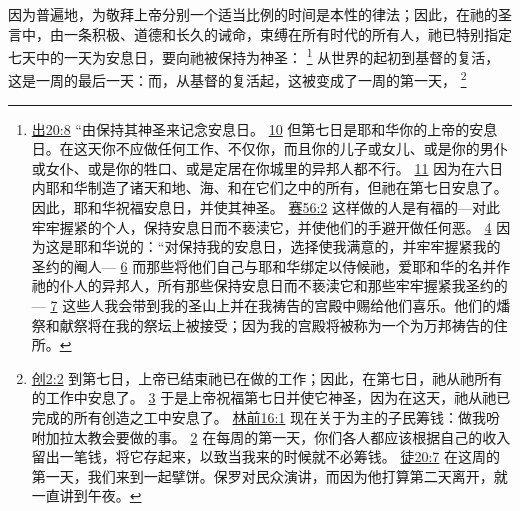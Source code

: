 \documentclass[12pt, a4paper, oneside]{ctexart}
\newcounter{parnum}[section]
\newcommand{\N}{%
   \noindent\refstepcounter{parnum}%
    \makebox[\parindent][l]{\textbf{\arabic{parnum}.}}}
\begin{document}
\N 因为普遍地，为敬拜上帝分别一个适当比例的时间是本性的律法；因此，在祂的圣言中，由一条积极、道德和长久的诫命，束缚在所有时代的所有人，祂已特别指定七天中的一天为安息日，要向祂被保持为神圣：
	\footnote {
		\href{https://biblehub.com/exodus/20-8.htm}{出20:8} “由保持其神圣来记念安息日。
		\href{https://biblehub.com/exodus/20-10.htm}{10} 但第七日是耶和华你的上帝的安息日。在这天你不应做任何工作、不仅你，而且你的儿子或女儿、或是你的男仆或女仆、或是你的牲口、或是定居在你城里的异邦人都不行。
		\href{https://biblehub.com/exodus/20-11.htm}{11} 因为在六日内耶和华制造了诸天和地、海、和在它们之中的所有，但祂在第七日安息了。因此，耶和华祝福安息日，并使其神圣。
		\href{https://biblehub.com/isaiah/56-2.htm}{赛56:2} 这样做的人是有福的---对此牢牢握紧的个人，保持安息日而不亵渎它，并使他们的手避开做任何恶。
		\href{https://biblehub.com/isaiah/56-4.htm}{4} 因为这是耶和华说的：“对保持我的安息日，选择使我满意的，并牢牢握紧我的圣约的阉人---
		\href{https://biblehub.com/isaiah/56-6.htm}{6} 而那些将他们自己与耶和华绑定以侍候祂，爱耶和华的名并作祂的仆人的异邦人，所有那些保持安息日而不亵渎它和那些牢牢握紧我圣约的---
		\href{https://biblehub.com/isaiah/56-7.htm}{7} 这些人我会带到我的圣山上并在我祷告的宫殿中赐给他们喜乐。他们的燔祭和献祭将在我的祭坛上被接受；因为我的宫殿将被称为一个为万邦祷告的住所。
	}
	从世界的起初到基督的复活，这是一周的最后一天：而，从基督的复活起，这被变成了一周的第一天，
	\footnote {
		\href{https://biblehub.com/genesis/2-2.htm}{创2:2} 到第七日，上帝已结束祂已在做的工作；因此，在第七日，祂从祂所有的工作中安息了。
		\href{https://biblehub.com/genesis/2-3.htm}{3} 于是上帝祝福第七日并使它神圣，因为在这天，祂从祂已完成的所有创造之工中安息了。
		\href{https://biblehub.com/1_corinthians/16-1.htm}{林前16:1} 现在关于为主的子民筹钱：做我吩咐加拉太教会要做的事。
		\href{https://biblehub.com/1_corinthians/16-2.htm}{2} 在每周的第一天，你们各人都应该根据自己的收入留出一笔钱，将它存起来，以致当我来的时候就不必筹钱。
		\href{https://biblehub.com/acts/20-7.htm}{徒20:7} 在这周的第一天，我们来到一起擘饼。保罗对民众演讲，而因为他打算第二天离开，就一直讲到午夜。
	}
\end{document}
